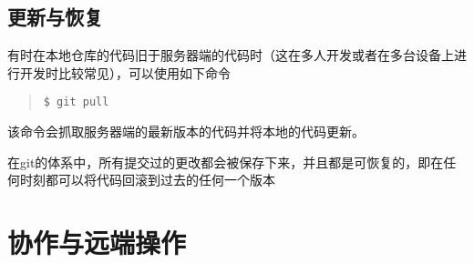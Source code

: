 \documentclass{article}
\begin{document}
		\subsection{更新与恢复} %
		\label{sub:更新与恢复}
			有时在本地仓库的代码旧于服务器端的代码时（这在多人开发或者在多台设备上进行开发时比较常见），可以使用如下命令
			\begin{quote}
				\begin{lstlisting}
$ git pull
				\end{lstlisting}
			\end{quote}
			该命令会抓取服务器端的最新版本的代码并将本地的代码更新。
			\par 在git的体系中，所有提交过的更改都会被保存下来，并且都是可恢复的，即在任何时刻都可以将代码回滚到过去的任何一个版本
	\section{协作与远端操作} %
	\label{sec:协作与远端操作}
\end{document}
